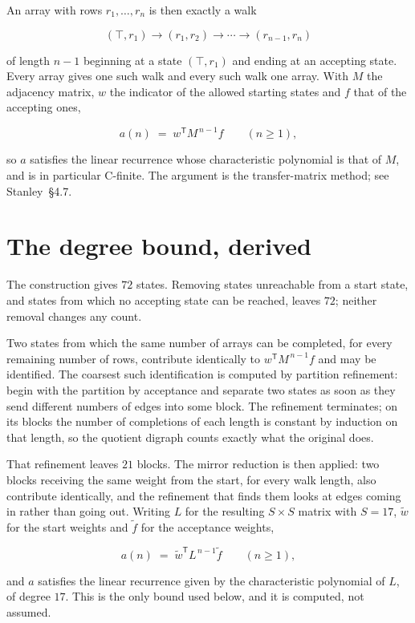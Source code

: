 \documentclass[11pt]{article}
\theoremstyle{definition}
\begin{document}
An array with rows $r_1,\dots,r_n$ is then exactly a walk

\[(\top,r_1) \to (r_1,r_2) \to \cdots \to (r_{n-1},r_n)\]

of length $n-1$ beginning at a state $(\top,r_1)$ and ending at an accepting state. Every array gives one such walk and every such walk one array. With $M$ the adjacency matrix, $w$ the indicator of the allowed starting states and $f$ that of the accepting ones,

\[a(n) \;=\; w^{\mathsf T} M^{\,n-1} f \qquad (n \ge 1),\]

so $a$ satisfies the linear recurrence whose characteristic polynomial is that of $M$, and is in particular C-finite. The argument is the transfer-matrix method; see Stanley~\S4.7.

\section{The degree bound, derived}

The construction gives $72$ states. Removing states unreachable from a start state, and states from which no accepting state can be reached, leaves $72$; neither removal changes any count.

Two states from which the same number of arrays can be completed, for every remaining number of rows, contribute identically to $w^{\mathsf T}M^{\,n-1}f$ and may be identified. The coarsest such identification is computed by partition refinement: begin with the partition by acceptance and separate two states as soon as they send different numbers of edges into some block. The refinement terminates; on its blocks the number of completions of each length is constant by induction on that length, so the quotient digraph counts exactly what the original does.

That refinement leaves $21$ blocks. The mirror reduction is then applied: two blocks receiving the same weight from the start, for every walk length, also contribute identically, and the refinement that finds them looks at edges coming in rather than going out. Writing $L$ for the resulting $S \times S$ matrix with $S = 17$, $\tilde w$ for the start weights and $\tilde f$ for the acceptance weights,

\[a(n) \;=\; \tilde w^{\mathsf T} L^{\,n-1} \tilde f \qquad (n \ge 1),\]

and $a$ satisfies the linear recurrence given by the characteristic polynomial of $L$, of degree $17$. This is the only bound used below, and it is computed, not assumed.
\end{document}
